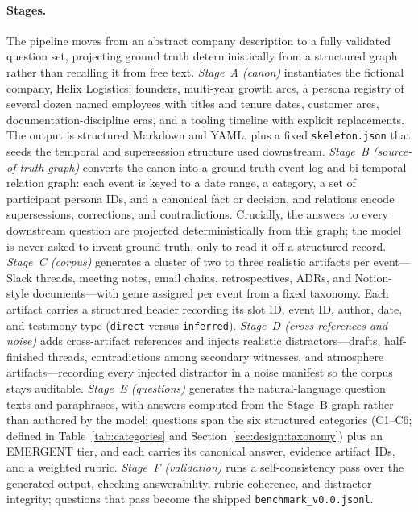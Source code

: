\paragraph{Stages.}
The pipeline moves from an abstract company description to a fully validated
question set, projecting ground truth deterministically from a structured
graph rather than recalling it from free text.
%
\emph{Stage~A (canon)} instantiates the fictional company, Helix Logistics:
founders, multi-year growth arcs, a persona registry of several dozen named
employees with titles and tenure dates, customer arcs, documentation-discipline
eras, and a tooling timeline with explicit replacements. The output is structured Markdown and YAML, plus a fixed
\texttt{skeleton.json} that seeds the temporal and supersession structure used
downstream.
%
\emph{Stage~B (source-of-truth graph)} converts the canon into a ground-truth
event log and bi-temporal relation graph: each event is keyed to a date range,
a category, a set of participant persona IDs, and a canonical fact or decision,
and relations encode supersessions, corrections, and contradictions. Crucially,
the answers to every downstream question are projected deterministically from
this graph; the model is never asked to invent ground truth, only to read it
off a structured record.
%
\emph{Stage~C (corpus)} generates a cluster of two to three realistic artifacts
per event---Slack threads, meeting notes, email chains, retrospectives, ADRs,
and Notion-style documents---with genre assigned per event from a fixed
taxonomy. Each artifact carries a structured header recording its slot ID,
event ID, author, date, and testimony type (\texttt{direct} versus
\texttt{inferred}).
%
\emph{Stage~D (cross-references and noise)} adds cross-artifact references and
injects realistic distractors---drafts, half-finished threads, contradictions
among secondary witnesses, and atmosphere artifacts---recording every injected
distractor in a noise manifest so the corpus stays auditable.
%
\emph{Stage~E (questions)} generates the natural-language question texts and
paraphrases, with answers computed from the Stage~B graph rather than authored
by the model; questions span the six structured categories (C1--C6; defined in
Table~\ref{tab:categories} and Section~\ref{sec:design:taxonomy}) plus an
EMERGENT tier, and each carries its canonical answer, evidence artifact IDs, and
a weighted rubric.
%
\emph{Stage~F (validation)} runs a self-consistency pass over the generated
output, checking answerability, rubric coherence, and distractor integrity;
questions that pass become the shipped \texttt{benchmark\_v0.0.jsonl}.

